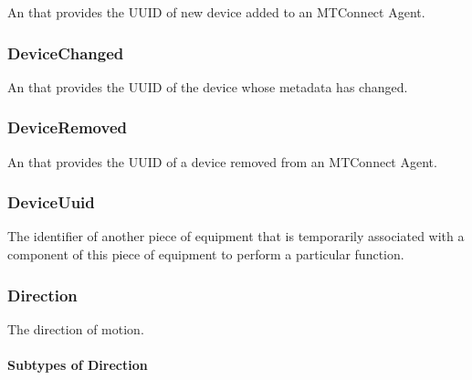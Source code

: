 An  that provides the \gls{UUID} of new device added to an \gls{MTConnect Agent}.



\subsubsection{DeviceChanged}
\label{sec:DeviceChanged}



An  that provides the \gls{UUID} of the device whose \gls{metadata} has changed.



\subsubsection{DeviceRemoved}
\label{sec:DeviceRemoved}



An  that provides the \gls{UUID} of a device removed from an \gls{MTConnect Agent}.



\subsubsection{DeviceUuid}
\label{sec:DeviceUuid}



The identifier of another piece of equipment that is temporarily associated with a component of this piece of equipment to perform a particular function.




\subsubsection{Direction}




The direction of motion.


\paragraph{Subtypes of Direction}\mbox{}
\label{sec:Subtypes of Direction}

